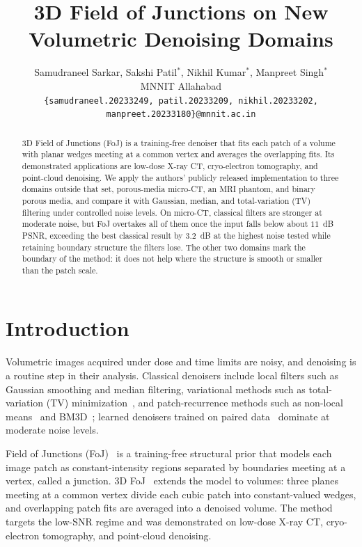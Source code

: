 \documentclass[11pt]{article}
\title{3D Field of Junctions on New Volumetric Denoising Domains}
\author{Samudraneel Sarkar, Sakshi Patil$^{*}$, Nikhil Kumar$^{*}$,
Manpreet Singh$^{*}$\\[1.4em]
MNNIT Allahabad\\[0.2em]
{\small\texttt{\{samudraneel.20233249, patil.20233209, nikhil.20233202,
manpreet.20233180\}@mnnit.ac.in}}}
\date{}
\begin{document}
\maketitle
\begingroup\renewcommand{\thefootnote}{}%
%
\endgroup

\begin{abstract}
3D Field of Junctions (FoJ) is a training-free denoiser that fits each
patch of a volume with planar wedges meeting at a common vertex and
averages the overlapping fits. Its demonstrated applications are
low-dose X-ray CT, cryo-electron tomography, and point-cloud denoising.
We apply the authors' publicly released implementation to three domains
outside that set, porous-media micro-CT, an MRI phantom, and binary
porous media, and compare it with Gaussian, median, and total-variation
(TV) filtering under controlled noise levels. On micro-CT, classical
filters are stronger at moderate noise, but FoJ overtakes all of them
once the input falls below about $11$~dB PSNR, exceeding the best
classical result by $3.2$~dB at the highest noise tested while retaining
boundary structure the filters lose. The other two domains mark the
boundary of the method: it does not help where the structure is smooth
or smaller than the patch scale.
\end{abstract}

\section{Introduction}

Volumetric images acquired under dose and time limits are noisy, and
denoising is a routine step in their analysis. Classical denoisers
include local filters such as Gaussian smoothing and median filtering,
variational methods such as total-variation (TV)
minimization~\cite{rudin1992nonlinear,chambolle2004algorithm}, and
patch-recurrence methods such as non-local means~\cite{buades2005nonlocal}
and BM3D~\cite{dabov2007image}; learned denoisers trained on paired
data~\cite{zhang2017beyond} dominate at moderate noise levels.

Field of Junctions (FoJ)~\cite{verbin2021foj} is a training-free
structural prior that models each image patch as constant-intensity
regions separated by boundaries meeting at a vertex, called a junction.
3D FoJ~\cite{moeini2026foj3d} extends the model to volumes: three planes
meeting at a common vertex divide each cubic patch into constant-valued
wedges, and overlapping patch fits are averaged into a denoised volume.
The method targets the low-SNR regime and was demonstrated on low-dose
X-ray CT, cryo-electron tomography, and point-cloud denoising.
\end{document}
